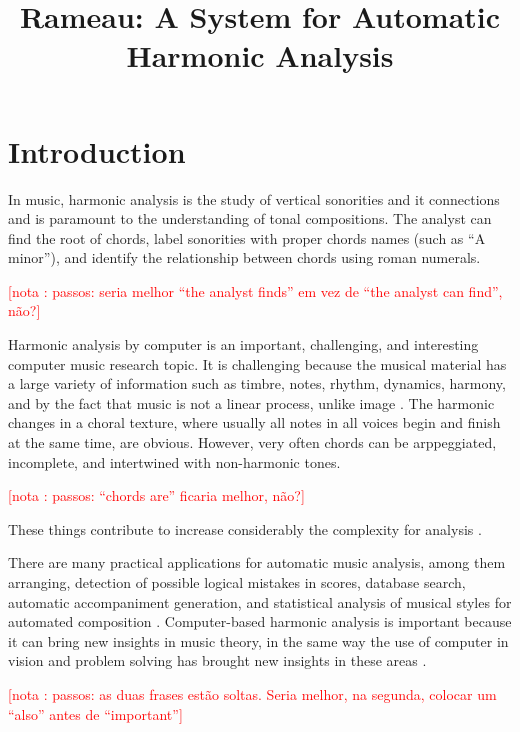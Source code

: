 \documentclass{article}
\title{Rameau: A System for Automatic Harmonic Analysis}
\newcounter{notacounter}
\newcommand{\nota}[1]{
  \addtocounter{notacounter}{1}
  \textcolor{red}{[nota \arabic{notacounter}: #1]}
}
\begin{document}
\maketitle

\begin{abstract}

\end{abstract}

\section{Introduction}
\label{sec:introduction}

In music, harmonic analysis is the study of vertical sonorities and it
connections and is paramount to the understanding of tonal
compositions. The analyst can find the root of chords, label
sonorities with proper chords names (such as ``A minor''), and
identify the relationship between chords using roman
numerals. \nota{passos: seria melhor ``the analyst finds'' em vez de
  ``the analyst can find'', não?}

Harmonic analysis by computer is an important, challenging, and
interesting computer music research topic. It is challenging because
the musical material has a large variety of information such as
timbre, notes, rhythm, dynamics, harmony, and by the fact that music
is not a linear process, unlike image \cite{mouton95:numeric}. The
harmonic changes in a choral texture, where usually all notes in all
voices begin and finish at the same time, are obvious. However, very
often chords can be arppeggiated, incomplete, and intertwined with
non-harmonic tones. \nota{passos: ``chords are'' ficaria melhor, não?}
These things contribute to increase considerably the complexity for
analysis \cite{pardo00:automated}.

There are many practical applications for automatic music analysis,
among them arranging, detection of possible logical mistakes in
scores, database search, automatic accompaniment generation, and
statistical analysis of musical styles for automated composition
\cite{pardo02:algorithms,temperley99:modeling}. Computer-based
harmonic analysis is important because it can bring new insights in
music theory, in the same way the use of computer in vision and
problem solving has brought new insights in these areas
\cite{temperley99:modeling}. \nota{passos: as duas frases estão
  soltas. Seria melhor, na segunda, colocar um ``also'' antes de
  ``important''}
\end{document}
